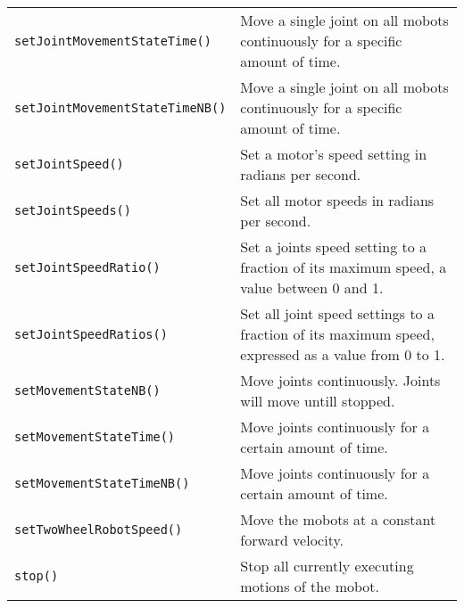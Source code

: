 \begin{tabular}{p{1.75in}p{4.5in}}
\texttt{setJointMovementStateTime()} & Move a single joint on all mobots continuously for a specific amount of time. \\
\texttt{setJointMovementStateTimeNB()} & Move a single joint on all mobots continuously for a specific amount of time. \\
\texttt{setJointSpeed()} & Set a motor's speed setting in radians per second. \\
\texttt{setJointSpeeds()} & Set all motor speeds in radians per second. \\
\texttt{setJointSpeedRatio()} & Set a joints speed setting to a fraction of its maximum speed, a value between 0 and 1. \\
\texttt{setJointSpeedRatios()} & Set all joint speed settings to a fraction of its
maximum speed, expressed as a value from 0 to 1. \\
\texttt{setMovementStateNB()} & Move joints continuously. Joints will move untill stopped.\\
\texttt{setMovementStateTime()} & Move joints continuously for a certain amount of time.\\
\texttt{setMovementStateTimeNB()} & Move joints continuously for a certain amount of time.\\
\texttt{setTwoWheelRobotSpeed()} & Move the mobots at a constant forward velocity. \\
\texttt{stop()} & Stop all currently executing motions of the mobot. \\
\hline
\end{tabular}

